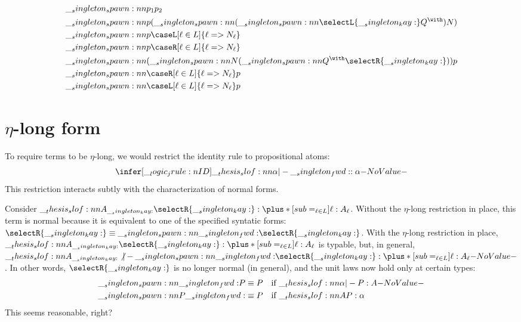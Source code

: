 \begin{equation*}
  \begin{lgathered}
    \spawn{p_1}{p_2} \\
    \spawn{p}{(\spawn{(\spawn{\selectL{\kay}}{Q^{\with}})}{N})} \\
    \spawn{p}{\caseL[\ell \in L]{\ell => N_{\ell}}} \\
    \spawn{p}{\caseR[\ell \in L]{\ell => N_{\ell}}} \\
    \spawn{(\spawn{N}{(\spawn{Q^{\with}}{\selectR{\kay}})})}{p} \\
    \spawn{\caseR[\ell \in L]{\ell => N_{\ell}}}{p} \\
    \spawn{\caseL[\ell \in L]{\ell => N_{\ell}}}{p}
  \end{lgathered}
\end{equation*}


\section{$\eta$-long form}

To require terms to be $\eta$-long, we would restrict the identity rule to propositional atoms:
\begin{equation*}
  \infer[\jrule{ID}]{\slof{\alpha |- \fwd : \alpha}}{}
\end{equation*}
This restriction interacts subtly with the characterization of normal forms.

Consider $\slof{A_{\kay} |- \selectR{\kay} : \plus*[sub=_{\ell \in L}]{\ell:A_{\ell}}}$.
Without the $\eta$-long restriction in place, this term is normal because it is equivalent to one of the specified syntatic forms: $\selectR{\kay} \equiv \spawn{\fwd}{\selectR{\kay}}$.
With the $\eta$-long restriction in place, $\slof{A_{\kay} |- \selectR{\kay} : \plus*[sub=_{\ell \in L}]{\ell:A_{\ell}}}$ is typable, but, in general, $\slof{A_{\kay} \not|- \spawn{\fwd}{\selectR{\kay}} : \plus*[sub=_{\ell \in L}]{\ell:A_{\ell}}}$.
In other words, $\selectR{\kay}$ is no longer normal (in general), and the unit laws now hold only at certain types:
\begin{equation*}
  \begin{lgathered}
    \spawn{\fwd}{P} \equiv P \quad\text{if $\slof{\alpha |- P : A}$} \\
    \spawn{P}{\fwd} \equiv P \quad\text{if $\slof{A |- P : \alpha}$}
  \end{lgathered}
\end{equation*}
This seems reasonable, right?

